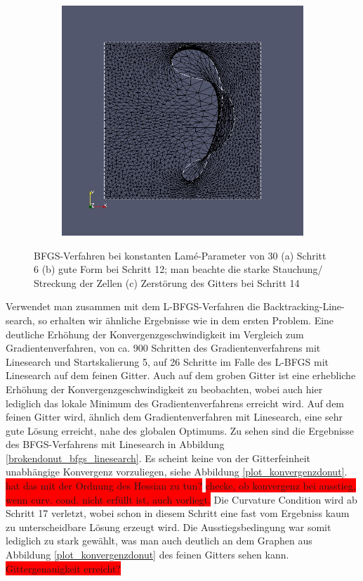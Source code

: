 \begin{figure}
\begin{subfigure}{0.315\textwidth}
	\caption{}	
	\end{subfigure}
	\begin{subfigure}{0.315\textwidth}
	\centering
	\includegraphics[scale=0.21]{pic_brokendonut_bfgs_konstlame_14.jpg}
	\caption{}	
	\end{subfigure}
\caption{BFGS-Verfahren bei konstanten Lamé-Parameter von 30 (a) Schritt 6 (b) gute Form bei Schritt 12; man beachte die starke Stauchung/ Streckung der Zellen (c) Zerstörung des Gitters bei Schritt 14}
\label{brokendonut_bfgs_konstlame}
\end{figure}

Verwendet man zusammen mit dem L-BFGS-Verfahren die Backtracking-Line-
search, so erhalten wir ähnliche Ergebnisse wie in dem ersten Problem. Eine deutliche Erhöhung der Konvergenzgeschwindigkeit im Vergleich zum Gradientenverfahren, von ca. 900 Schritten des Gradientenverfahrens mit Linesearch und Startskalierung 5, auf 26 Schritte im Falle des L-BFGS mit Linesearch auf dem feinen Gitter. Auch auf dem groben Gitter ist eine erhebliche Erhöhung der Konvergenzgeschwindigkeit zu beobachten, wobei auch hier lediglich das lokale Minimum des Gradientenverfahrens erreicht wird. Auf dem feinen Gitter wird, ähnlich dem Gradientenverfahren mit Linesearch, eine sehr gute Lösung erreicht, nahe des globalen Optimums. Zu sehen sind die Ergebnisse des BFGS-Verfahrens mit Linesearch in Abbildung \ref{brokendonut_bfgs_linesearch}. Es scheint keine von der Gitterfeinheit unabhängige Konvergenz vorzuliegen, siehe Abbildung \ref{plot_konvergenzdonut}. \colorbox{red}{hat das mit der Ordnung des Hessian zu tun?}
\colorbox{red}{checke, ob konvergenz bei ausstieg, wenn curv. cond. nicht erfüllt ist, auch vorliegt.}
Die Curvature Condition wird ab Schritt 17 verletzt, wobei schon in diesem Schritt eine fast vom Ergebniss kaum zu unterscheidbare Lösung erzeugt wird. Die Ausstiegsbedingung war somit lediglich zu stark gewählt, was man auch deutlich an dem Graphen aus Abbildung \ref{plot_konvergenzdonut} des feinen Gitters sehen kann. 
\colorbox{red}{Gittergenauigkeit erreicht?}

